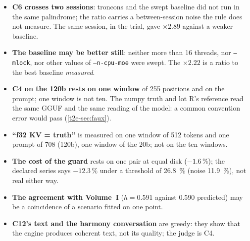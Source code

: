 \begin{faux}
\begin{itemize}
\item \textbf{C6 crosses two sessions}: troncons and the swept baseline did not run in the same palindrome; the ratio carries a between-session noise the rule does not measure. The same session, in the trial, gave $\times 2.89$ against a weaker baseline.
\item \textbf{The baseline may be better still}: neither more than 16 threads, nor \texttt{--mlock}, nor other values of \texttt{--n-cpu-moe} were swept. The $\times 2.22$ is a ratio to the best baseline \emph{measured}.
\item \textbf{C4 on the 120b rests on one window} of 255 positions and on the prompt; one window is not ten. The numpy truth and lot R's reference read the same GGUF and the same reading of the model: a common convention error would pass (\cref{t2e-sec:faux}).
\item \textbf{``f32 KV = truth''} is measured on one window of 512 tokens and one prompt of 708 (120b), one window of the 20b; not on the ten windows.
\item \textbf{The cost of the guard} rests on one pair at equal disk ($-1.6\,\%$); the declared series says $-12.3\,\%$ under a threshold of \SI{26.8}{\percent} (noise \SI{11.9}{\percent}), not real either way.
\item \textbf{The agreement with Volume~I} ($h = 0.591$ against \num{0.590} predicted) may be a coincidence of a scenario fitted on one point.
\item \textbf{C12's text and the harmony conversation} are greedy: they show that the engine produces coherent text, not its quality; the judge is C4.
\end{itemize}
\end{faux}
